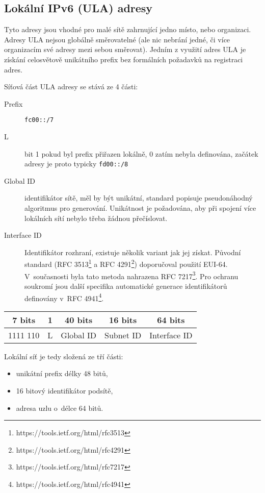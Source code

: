 \subsection{Lokální IPv6 (ULA) adresy}\label{ula}

Tyto adresy jsou vhodné pro malé sítě zahrnující jedno místo, nebo organizaci.
Adresy ULA nejsou globálně směrovatelné (ale nic nebrání jedné, či více
organizacím své adresy mezi sebou směrovat). Jedním z využití adres ULA je
získání celosvětově unikátního prefix bez formálních požadavků na registraci
adres.

Síťová část ULA adresy se stává ze 4 části:
\begin{description}
    \item [Prefix] {\tt fc00::/7}
    \item [L] bit 1 pokud byl prefix přiřazen lokálně, 0 zatím nebyla
        definována, začátek adresy je proto typicky {\tt fd00::/8}
    \item [Global ID] identifikátor sítě, měl by být unikátní, standard
        popisuje pseudonáhodný algoritmus pro generování. Unikátnost je
        požadována, aby při spojení více lokálních sítí nebylo třeba žádnou
        přečíslovat.
    \item [Interface ID] Identifikátor rozhraní, existuje několik variant jak
        jej získat. Původní standard (RFC
        3513\footnote{https://tools.ietf.org/html/rfc3513} a RFC
        4291\footnote{https://tools.ietf.org/html/rfc4291}) doporučoval použití
        EUI-64. V~současnosti byla tato metoda nahrazena RFC
        7217\footnote{https://tools.ietf.org/html/rfc7217}. Pro ochranu
        soukromí jsou další specifika automatické generace identifikátorů
        definovány v~RFC 4941\footnote{https://tools.ietf.org/html/rfc4941}.
\end{description}

\begin{table}[ht!]
    \begin{center}
        \begin{tabular}{c|c|c|c|c}
            7 bits & 1 &  40 bits  &  16 bits  & 64 bits \\
            \hline
            1111 110 & L & Global ID & Subnet ID & Interface ID \\
            \hline
        \end{tabular}
    \end{center}
\end{table}

Lokální síť je tedy složená ze tří části:
\begin{itemize}
    \item unikátní prefix délky 48 bitů,
    \item 16 bitový identifikátor podsítě,
    \item adresa uzlu o~délce 64 bitů.
\end{itemize}

